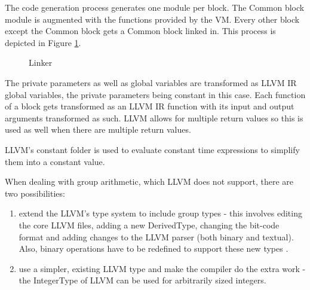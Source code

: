 The code generation process generates one module per block. The Common
block module is augmented with the functions provided by the VM.
Every other block except the Common block gets a Common block linked
in. This process is depicted in Figure \ref{fig:linker}.

\begin{figure}[hb!]
  \centering
  \caption{Linker}
  \label{fig:linker}
\end{figure}

The private parameters as well as global variables are transformed as
LLVM IR global variables, the private parameters being constant in
this case. Each function of a block gets transformed as an LLVM IR
function with its input and output arguments transformed as such. LLVM
allows for multiple return values so this is used as well when there
are multiple return values.

LLVM's constant folder is used to evaluate constant time expressions
to simplify them into a constant value.

When dealing with group arithmetic, which LLVM does not support, there are
two possibilities:
\begin{enumerate}
\item extend the LLVM's type system to include group types - this
  involves editing the core LLVM files, adding a new DerivedType,
  changing the bit-code format and adding changes to the LLVM parser
  (both binary and textual). Also, binary operations have to be redefined
  to support these new types \cite{extending_llvm}.
\item use a simpler, existing LLVM type and make the compiler do the
  extra work - the IntegerType of LLVM can be used for arbitrarily sized
  integers.
\end{enumerate}

